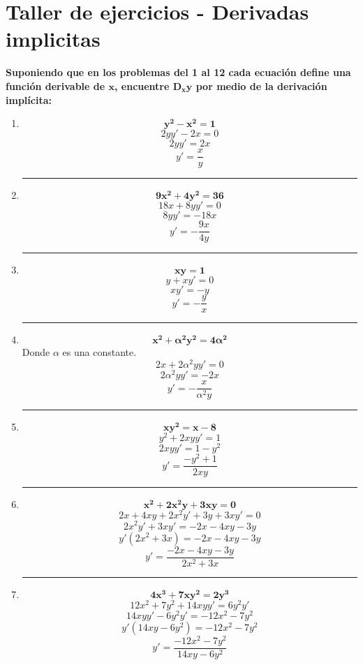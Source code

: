 \documentclass[12pt]{article}
\begin{document}
    

    \section*{\centering Taller de ejercicios - Derivadas implicitas} \vspace{0.5cm}
        \textbf{Suponiendo que en los problemas del 1 al 12 cada ecuación define una función derivable de $\bm{x}$, encuentre $\bm{D_{x}y}$ por medio de la derivación implícita:}

        \vspace{0.5cm}
        \begin{enumerate}[label=\textbf{\arabic*)}] 
            \hrule\item \[\bm{y^2 - x^2 = 1}\]
                \[2yy' - 2x = 0 \] 
                \[2yy' = 2x \] 
                \[y' = \frac{x}{y} \] 

            \hrule\item \[\bm{9x^2 + 4y^2 = 36}\]
                \[18x + 8yy' = 0 \] 
                \[8yy' = - 18x\] 
                \[y' = - \frac{9x}{4y}\] 

            \hrule\item \[\bm{xy = 1}\]
                \[y + xy' = 0\] 
                \[xy' = - y\] 
                \[y' = - \frac{y}{x}\] 
            
            \hrule\item \[\bm{x^2 + \alpha^2 y^2 = 4\alpha^2}\] Donde $\alpha$ es una constante.
                \[2x + 2\alpha^2 yy' = 0\] 
                \[2\alpha^2 yy' = - 2x\] 
                \[y' = - \frac{x}{\alpha^2 y}\] 

            \hrule\item \[\bm{xy^2 = x - 8}\]
                \[y^2 + 2xyy' = 1\] 
                \[2xyy' = 1 - y^2\]
                \[y' = \frac{ - y^2 + 1}{2xy}\]  
                
            \hrule\item \[\bm{x^2 + 2x^2 y + 3xy = 0}\]
                \[2x + 4xy + 2x^2y' + 3y + 3xy' = 0\]
                \[2x^2y' + 3xy' = - 2x - 4xy - 3y\] 
                \[y'(2x^2 + 3x) = - 2x - 4xy - 3y\]
                \[y' = \frac{- 2x - 4xy - 3y}{2x^2 + 3x}\]   

            \hrule\item \[\bm{4x^3 + 7xy^2 = 2y^3}\]
                \[12x^2 + 7y^2 + 14xyy'= 6y^2y'\]
                \[14xyy' - 6y^2y' = - 12x^2 - 7y^2 \] 
                \[y'(14xy - 6y^2) = - 12x^2 - 7y^2 \]  
                \[y'= \frac{- 12x^2 - 7y^2}{14xy - 6y^2}\]  


\end{enumerate}
\end{document}
